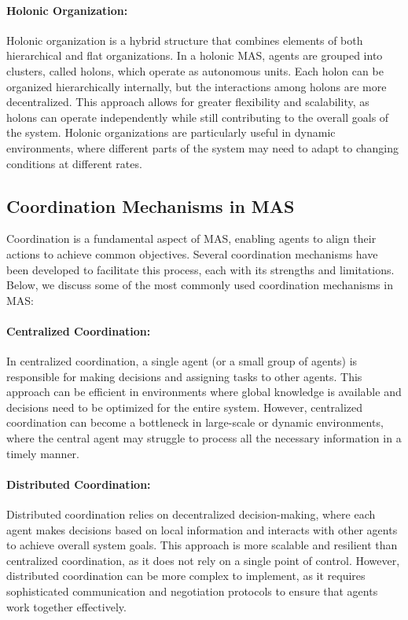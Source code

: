 \paragraph{Holonic Organization:}
Holonic organization is a hybrid structure that combines elements of both hierarchical and flat organizations. In a holonic MAS, agents are grouped into clusters, called holons, which operate as autonomous units. Each holon can be organized hierarchically internally, but the interactions among holons are more decentralized. This approach allows for greater flexibility and scalability, as holons can operate independently while still contributing to the overall goals of the system. Holonic organizations are particularly useful in dynamic environments, where different parts of the system may need to adapt to changing conditions at different rates.

\subsection{Coordination Mechanisms in MAS}

Coordination is a fundamental aspect of MAS, enabling agents to align their actions to achieve common objectives. Several coordination mechanisms have been developed to facilitate this process, each with its strengths and limitations. Below, we discuss some of the most commonly used coordination mechanisms in MAS:

\paragraph{Centralized Coordination:}
In centralized coordination, a single agent (or a small group of agents) is responsible for making decisions and assigning tasks to other agents. This approach can be efficient in environments where global knowledge is available and decisions need to be optimized for the entire system. However, centralized coordination can become a bottleneck in large-scale or dynamic environments, where the central agent may struggle to process all the necessary information in a timely manner.

\paragraph{Distributed Coordination:}
Distributed coordination relies on decentralized decision-making, where each agent makes decisions based on local information and interacts with other agents to achieve overall system goals. This approach is more scalable and resilient than centralized coordination, as it does not rely on a single point of control. However, distributed coordination can be more complex to implement, as it requires sophisticated communication and negotiation protocols to ensure that agents work together effectively.

